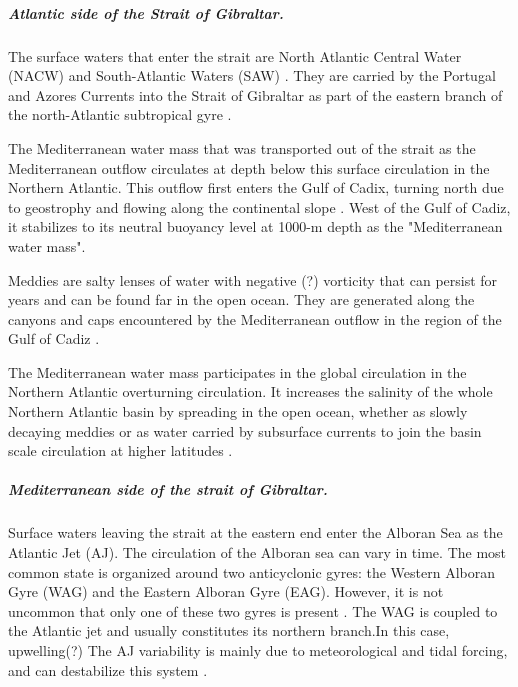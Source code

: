 \subparagraph{Atlantic side of the Strait of Gibraltar.}

The surface waters that enter the strait are North Atlantic Central Water (NACW) and South-Atlantic Waters (SAW) \citep{millot_2014,naranjo_2015}. They are carried by the Portugal and Azores Currents into the Strait of Gibraltar as part of the eastern branch of the north-Atlantic subtropical gyre \citep{barton_2001}.

The Mediterranean water mass that was transported out of the strait as the Mediterranean outflow circulates at depth below this surface circulation in the Northern Atlantic. This outflow first enters the Gulf of Cadix, turning north due to geostrophy and flowing along the continental slope \citep{price_1993,gasser_2017}. West of the Gulf of Cadiz, it stabilizes to its neutral buoyancy level at 1000-m depth as the "Mediterranean water mass"\citep{price_1993}.

Meddies are salty lenses of water with negative  \color{blue}(?) \color{black} vorticity that can persist for years and can be found far in the open ocean. \color{blue}They \color{black} are generated along the canyons and caps encountered by the Mediterranean outflow in the region of the Gulf of Cadiz \citep{bashmachnikov_2015}. 

The Mediterranean water mass participates in the global circulation in the Northern Atlantic overturning circulation. It increases the salinity of the whole Northern Atlantic basin by spreading in the open ocean, whether as slowly decaying meddies or as water carried by subsurface currents to join the basin scale circulation at higher latitudes \citep{price_1993,jia_2007}.

\subparagraph{Mediterranean side of the strait of Gibraltar.} 

Surface waters leaving the strait at the eastern end enter the Alboran Sea as the Atlantic Jet (AJ). The circulation of the Alboran sea can vary in time. The most common state is organized around two anticyclonic gyres: the Western Alboran Gyre (WAG) and the Eastern Alboran Gyre (EAG). However, it is not uncommon that only one of these two gyres is present \citep{millot_2005}. The WAG is coupled to the Atlantic jet and usually constitutes its northern branch.\color{red}In this case, upwelling(?)\color{black} The AJ variability is mainly due to meteorological and tidal forcing, and can destabilize this system \citep{sanchez-garrido_2013,lorente_2019}.

